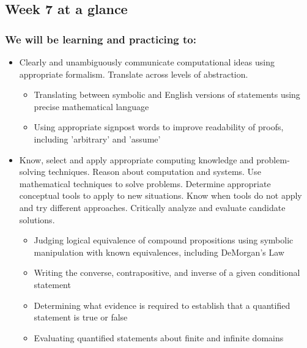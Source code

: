 \newpage

\subsection*{Week 7 at a glance}

\subsubsection*{We will be learning and practicing to:}
\begin{itemize}

\item Clearly and unambiguously communicate computational ideas using appropriate formalism. Translate across levels of abstraction.
\begin{itemize}
   \item Translating between symbolic and English versions of statements using precise mathematical language
    \item Using appropriate signpost words to improve readability of proofs, including 'arbitrary' and 'assume'
\end{itemize}

\item Know, select and apply appropriate computing knowledge and problem-solving techniques. Reason about computation and systems. Use mathematical techniques to solve problems. Determine appropriate conceptual tools to apply to new situations. Know when tools do not apply and try different approaches. Critically analyze and evaluate candidate solutions.
\begin{itemize}
    \item Judging logical equivalence of compound propositions using symbolic manipulation with known equivalences, including DeMorgan's Law
    \item Writing the converse, contrapositive, and inverse of a given conditional statement
    \item Determining what evidence is required to establish that a quantified statement is true or false
    \item Evaluating quantified statements about finite and infinite domains
\end{itemize}


\end{itemize}
